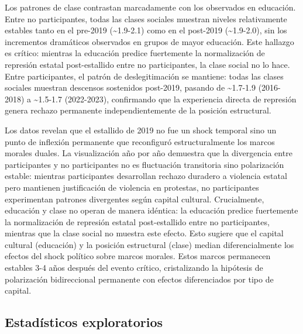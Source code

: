 \documentclass[
  13pt,
]{article}
\begin{document}
Los patrones de clase contrastan marcadamente con los observados en
educación. Entre no participantes, todas las clases sociales muestran
niveles relativamente estables tanto en el pre-2019
(\textasciitilde1.9-2.1) como en el post-2019 (\textasciitilde1.9-2.0),
sin los incrementos dramáticos observados en grupos de mayor educación.
Este hallazgo es crítico: mientras la educación predice fuertemente la
normalización de represión estatal post-estallido entre no
participantes, la clase social no lo hace. Entre participantes, el
patrón de deslegitimación se mantiene: todas las clases sociales
muestran descensos sostenidos post-2019, pasando de
\textasciitilde1.7-1.9 (2016-2018) a \textasciitilde1.5-1.7 (2022-2023),
confirmando que la experiencia directa de represión genera rechazo
permanente independientemente de la posición estructural.

Los datos revelan que el estallido de 2019 no fue un shock temporal sino
un punto de inflexión permanente que reconfiguró estructuralmente los
marcos morales duales. La visualización año por año demuestra que la
divergencia entre participantes y no participantes no es fluctuación
transitoria sino polarización estable: mientras participantes
desarrollan rechazo duradero a violencia estatal pero mantienen
justificación de violencia en protestas, no participantes experimentan
patrones divergentes según capital cultural. Crucialmente, educación y
clase no operan de manera idéntica: la educación predice fuertemente la
normalización de represión estatal post-estallido entre no
participantes, mientras que la clase social no muestra este efecto. Esto
sugiere que el capital cultural (educación) y la posición estructural
(clase) median diferencialmente los efectos del shock político sobre
marcos morales. Estos marcos permanecen estables 3-4 años después del
evento crítico, cristalizando la hipótesis de polarización bidireccional
permanente con efectos diferenciados por tipo de capital.

\subsection{Estadísticos
exploratorios}\label{estaduxedsticos-exploratorios}
\end{document}
